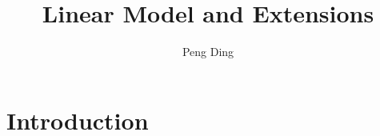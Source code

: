 \documentclass[krantz2]{krantz}
\begin{document}
\frontmatter

\title{Linear Model and Extensions}
\author{Peng Ding}




\maketitle



\tableofcontents

  
  
  


\mainmatter





\makeatletter
{}
\makeatother

\renewcommand {\theexample} {\thechapter.\arabic{example}}
\renewcommand {\theassumption} {\thechapter.\arabic{assumption}}
\renewcommand {\thelemma} {\thechapter.\arabic{lemma}}
\renewcommand {\thetheorem} {\thechapter.\arabic{theorem}}
\renewcommand {\theremark} {\thechapter.\arabic{remark}}
\renewcommand {\theproposition} {\thechapter.\arabic{proposition}}
\renewcommand {\thecorollary} {\thechapter.\arabic{corollary}}
 \renewcommand {\thecondition} {\thechapter.\arabic{condition}}
 \renewcommand {\thedefinition} {\thechapter.\arabic{definition}}



 

\part{Introduction}


 
  
\end{document}
